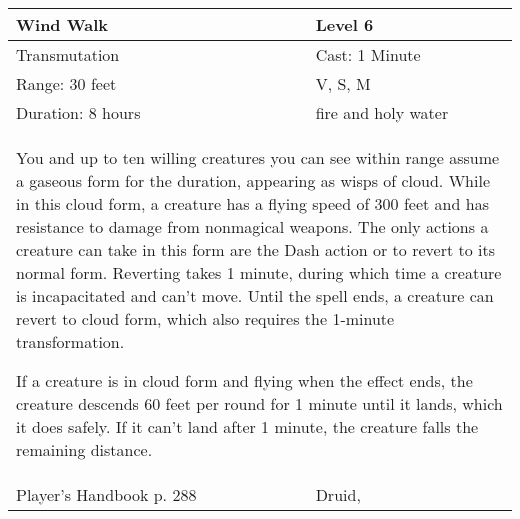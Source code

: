 \documentclass[11pt]{report}
\begin{document}
\begin{table}[H]
	\begin{tabular}{||p{6cm}|p{6cm}||}
		\hline\hline
		\bf{Wind Walk} & Level 6\\ \hline
		Transmutation & Cast: 1 Minute\\ \hline
		Range: 30 feet & V, S, M\\ \hline
		Duration: 8 hours & fire and holy water\\ \hline
		\multicolumn{2}{||p{12cm}||}{You and up to ten willing creatures you can see within range assume a gaseous form for the duration, appearing as wisps of cloud.
While in this cloud form, a creature has a flying speed of 300 feet and has resistance to damage from nonmagical weapons. The only actions a creature can take in this form are the Dash action or to revert to its normal form.
Reverting takes 1 minute, during which time a creature is incapacitated and can’t move. Until the spell ends, a creature can revert to cloud form, which also requires the 1-minute transformation.

If a creature is in cloud form and flying when the effect ends, the creature descends 60 feet per round for 1 minute until it lands, which it does safely. If it can’t land after 1 minute, the creature falls the remaining distance.}\\ \hline
Player's Handbook p. 288 & Druid, \\ \hline\hline
	\end{tabular}
\end{table}
\end{document}
